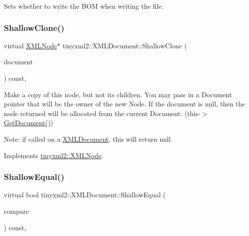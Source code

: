 Sets whether to write the B\+OM when writing the file. \mbox{\label{classtinyxml2_1_1_x_m_l_document_aa37cc1709d7e1e988bc17dcfb24a69b8}} 
\subsubsection{\texorpdfstring{ShallowClone()}{ShallowClone()}}
{\footnotesize\ttfamily virtual \mbox{\hyperlink{classtinyxml2_1_1_x_m_l_node}{X\+M\+L\+Node}}$\ast$ tinyxml2\+::\+X\+M\+L\+Document\+::\+Shallow\+Clone (\begin{DoxyParamCaption}\item[{\mbox{\hyperlink{classtinyxml2_1_1_x_m_l_document}{X\+M\+L\+Document}} $\ast$}]{document }\end{DoxyParamCaption}) const\hspace{0.3cm}{\ttfamily [inline]}, {\ttfamily [virtual]}}

Make a copy of this node, but not its children. You may pass in a Document pointer that will be the owner of the new Node. If the \textquotesingle{}document\textquotesingle{} is null, then the node returned will be allocated from the current Document. (this-\/$>$\mbox{\hyperlink{classtinyxml2_1_1_x_m_l_node_af343d1ef0b45c0020e62d784d7e67a68}{Get\+Document()}})

Note\+: if called on a \mbox{\hyperlink{classtinyxml2_1_1_x_m_l_document}{X\+M\+L\+Document}}, this will return null. 

Implements \mbox{\hyperlink{classtinyxml2_1_1_x_m_l_node_a8402cbd3129d20e9e6024bbcc0531283}{tinyxml2\+::\+X\+M\+L\+Node}}.

\mbox{\label{classtinyxml2_1_1_x_m_l_document_a6fe5ef18699091844fcf64b56ffa5bf9}} 
\subsubsection{\texorpdfstring{ShallowEqual()}{ShallowEqual()}}
{\footnotesize\ttfamily virtual bool tinyxml2\+::\+X\+M\+L\+Document\+::\+Shallow\+Equal (\begin{DoxyParamCaption}\item[{const \mbox{\hyperlink{classtinyxml2_1_1_x_m_l_node}{X\+M\+L\+Node}} $\ast$}]{compare }\end{DoxyParamCaption}) const\hspace{0.3cm}{\ttfamily [inline]}, {\ttfamily [virtual]}}

